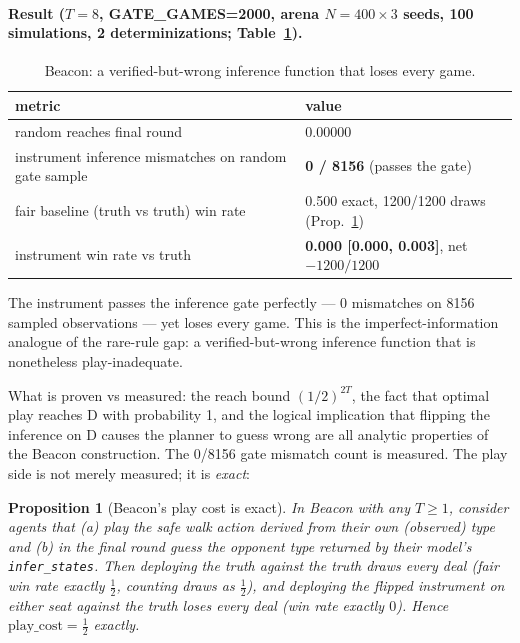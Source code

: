 \documentclass[11pt]{article}
\newtheorem{proposition}{Proposition}
\theoremstyle{remark}
\begin{document}
\paragraph{Result ($T=8$, GATE\_GAMES=2000, arena $N=400\times 3$ seeds, 100 simulations, 2 determinizations; Table~\ref{tab:beacon}).}

\begin{table}[ht]
\centering
\small
\begin{tabular}{ll}
\toprule
metric & value \\
\midrule
random reaches final round & 0.00000 \\
instrument inference mismatches on random gate sample & \textbf{0 / 8156} (passes the gate) \\
fair baseline (truth vs truth) win rate & 0.500 exact, 1200/1200 draws (Prop.~\ref{prop:beaconexact}) \\
instrument win rate vs truth & \textbf{0.000 [0.000, 0.003]}, net $-1200/1200$ \\
\bottomrule
\end{tabular}
\caption{Beacon: a verified-but-wrong inference function that loses every game.}
\label{tab:beacon}
\end{table}

The instrument passes the inference gate perfectly --- 0 mismatches on 8156 sampled observations --- yet loses every game. This is the imperfect-information analogue of the rare-rule gap: a verified-but-wrong inference function that is nonetheless play-inadequate.

What is proven vs measured: the reach bound $(1/2)^{2T}$, the fact that optimal play reaches D with probability 1, and the logical implication that flipping the inference on D causes the planner to guess wrong are all analytic properties of the Beacon construction. The 0/8156 gate mismatch count is measured. The play side is not merely measured; it is \emph{exact}:

\begin{proposition}[Beacon's play cost is exact]
\label{prop:beaconexact}
In Beacon with any $T \geq 1$, consider agents that (a) play the safe walk action derived from their own (observed) type and (b) in the final round guess the opponent type returned by their model's \texttt{infer\_states}. Then deploying the truth against the truth draws \emph{every} deal (fair win rate exactly $\tfrac12$, counting draws as $\tfrac12$), and deploying the flipped instrument on either seat against the truth loses \emph{every} deal (win rate exactly $0$). Hence $\mathrm{play\_cost} = \tfrac12$ exactly.
\end{proposition}
\end{document}

